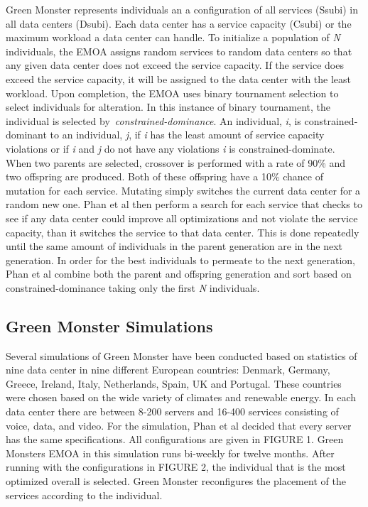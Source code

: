 \documentclass{sig-alternate}
\begin{document}
Green Monster represents individuals an a configuration of all services (Ssubi) in all data centers (Dsubi). Each data center has a service capacity (Csubi) or the maximum workload a data center can handle. To initialize a population of \emph{N} individuals, the EMOA assigns random services to random data centers so that any given data center does not exceed the service capacity. If the service does exceed the service capacity, it will be assigned to the data center with the least workload. Upon completion, the EMOA uses binary tournament selection to select individuals for alteration. In this instance of binary tournament, the individual is selected by~\emph{constrained-dominance}. An individual, \emph{i},  is constrained-dominant to an individual, \emph{j}, if \emph{i} has the least amount of service capacity violations or if \emph{i} and \emph{j} do not have any violations \emph{i} is constrained-dominate. When two parents are selected, crossover is performed with a rate of 90\% and two offspring are produced. Both of these offspring have a 10\% chance of mutation for each service. Mutating simply switches the current data center for a random new one. Phan et al then perform a search for each service that checks to see if any data center could improve all optimizations and not violate the service capacity, than it switches the service to that data center. This is done repeatedly until the same amount of individuals in the parent generation are in the next generation. In order for the best individuals to permeate to the next generation, Phan et al combine both the parent and offspring generation and sort based on constrained-dominance taking only the first \emph{N} individuals.

\subsection{Green Monster Simulations}
\label{sec:GMSims}
 
Several simulations of Green Monster have been conducted based on statistics of nine data center in nine different European countries: Denmark, Germany, Greece, Ireland, Italy, Netherlands, Spain, UK and Portugal. These countries were chosen based on the wide variety of climates and renewable energy. In each data center there are between 8-200 servers and 16-400 services consisting of voice, data, and video. For the simulation, Phan et al decided that every server has the same specifications. All configurations are given in FIGURE 1. Green Monsters EMOA in this simulation runs bi-weekly for twelve months. After running with the configurations in FIGURE 2, the individual that is the most optimized overall is selected. Green Monster reconfigures the placement of the services according to the individual. 
\end{document}
